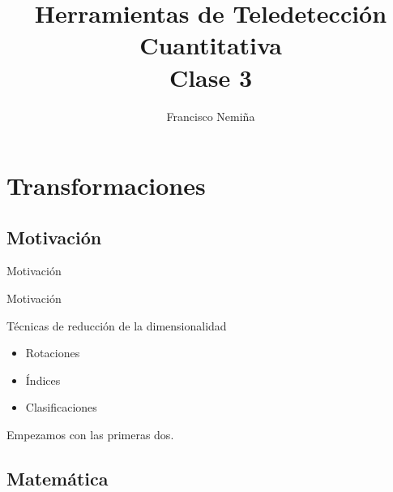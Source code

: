 \documentclass[handout]{beamer}
\title{Herramientas de Teledetección Cuantitativa\\{\small Clase 3}}
\author{Francisco Nemi\~na}
\institute{Unidad de Educaci\'on y Formaci\'on Masiva \\ Comisi\'on Nacional de
Actividades Espaciales}
\date{}
\begin{document}
\begin{frame}
    \maketitle
\end{frame}

\section{Transformaciones}
\subsection{Motivaci\'on}

\begin{frame}{Motivaci\'on}
  \begin{center}
    \end{center}
\end{frame}

\begin{frame}{Motivaci\'on}
  \begin{block}{T\'ecnicas de reducci\'on de la dimensionalidad}
    \begin{itemize}[<+>]
      \item Rotaciones
      \item \'Indices
      \item Clasificaciones
    \end{itemize}
    \pause
    Empezamos con las primeras dos.
  \end{block}
\end{frame}

\subsection{Matem\'atica}
\end{document}
